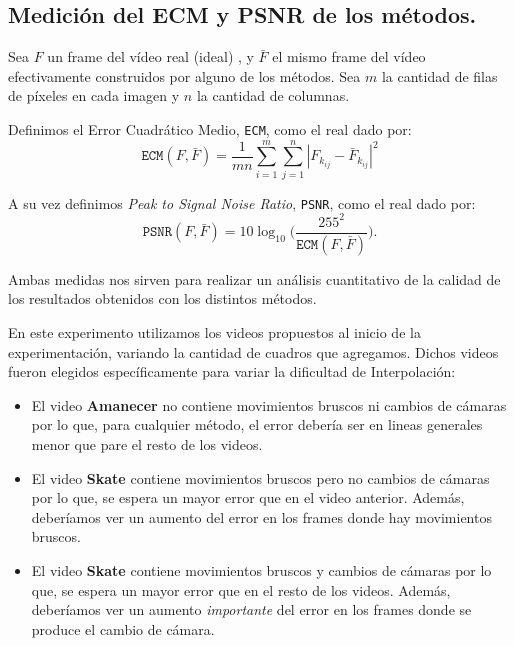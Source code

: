 \subsection{Medición del ECM y PSNR de los métodos.}\label{ECM}
Sea $F$ un frame del vídeo real (ideal) , y $\bar{F}$ el mismo frame del vídeo efectivamente construidos por alguno de los métodos. Sea $m$ la cantidad de filas de píxeles en cada imagen y $n$ la cantidad de columnas.

Definimos el Error Cuadrático Medio, \texttt{ECM}, como el real dado por:
\begin{equation}
\texttt{ECM}(F,\bar{F}) = \frac{1}{mn}\sum_{i=1}^m\sum_{j = 1}^n |F_{k_{ij}} - \bar{F}_{k_{ij}}|^2
\end{equation}

A su vez definimos \emph{Peak to Signal Noise Ratio}, \texttt{PSNR}, como el real dado por:
\begin{equation}
\texttt{PSNR}(F,\bar{F}) = 10 \log_{10}\bigg(\frac{255^2}{\texttt{ECM}(F,\bar{F})}\bigg). \label{eq:psnr}
\end{equation}

Ambas medidas nos sirven para realizar un análisis cuantitativo de la calidad de los resultados obtenidos con los distintos métodos.

En este experimento utilizamos los videos propuestos al inicio de la experimentación, variando la cantidad de cuadros que agregamos.
Dichos videos fueron elegidos específicamente para variar la dificultad de Interpolación:
\begin{itemize}
    \item El video \textbf{Amanecer} no contiene movimientos bruscos ni cambios de cámaras
        por lo que, para cualquier método, el error debería ser en lineas generales
        menor que pare el resto de los videos.
    \item El video \textbf{Skate} contiene movimientos bruscos pero no cambios de cámaras
        por lo que, se espera un mayor error que en el video anterior. Además,
        deberíamos ver un aumento del error en los frames donde hay movimientos
        bruscos.
    \item El video \textbf{Skate} contiene movimientos bruscos y cambios de cámaras
        por lo que, se espera un mayor error que en el resto de los videos. Además,
        deberíamos ver un aumento \textit{importante} del error en los frames
        donde se produce el cambio de cámara.
\end{itemize}

